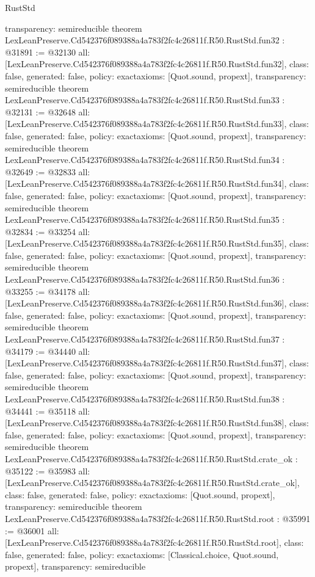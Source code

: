 \begin{lexlean}{RustStd}
\begin{coremodule}
{  transparency: semireducible
}
theorem LexLeanPreserve.Cd542376f089388a4a783f2fc4c26811f.R50.RustStd.fun32 : @31891 := @32130 {
  all: [LexLeanPreserve.Cd542376f089388a4a783f2fc4c26811f.R50.RustStd.fun32],
  class: false,
  generated: false,
  policy: exact{axioms: [Quot.sound, propext]},
  transparency: semireducible
}
theorem LexLeanPreserve.Cd542376f089388a4a783f2fc4c26811f.R50.RustStd.fun33 : @32131 := @32648 {
  all: [LexLeanPreserve.Cd542376f089388a4a783f2fc4c26811f.R50.RustStd.fun33],
  class: false,
  generated: false,
  policy: exact{axioms: [Quot.sound, propext]},
  transparency: semireducible
}
theorem LexLeanPreserve.Cd542376f089388a4a783f2fc4c26811f.R50.RustStd.fun34 : @32649 := @32833 {
  all: [LexLeanPreserve.Cd542376f089388a4a783f2fc4c26811f.R50.RustStd.fun34],
  class: false,
  generated: false,
  policy: exact{axioms: [Quot.sound, propext]},
  transparency: semireducible
}
theorem LexLeanPreserve.Cd542376f089388a4a783f2fc4c26811f.R50.RustStd.fun35 : @32834 := @33254 {
  all: [LexLeanPreserve.Cd542376f089388a4a783f2fc4c26811f.R50.RustStd.fun35],
  class: false,
  generated: false,
  policy: exact{axioms: [Quot.sound, propext]},
  transparency: semireducible
}
theorem LexLeanPreserve.Cd542376f089388a4a783f2fc4c26811f.R50.RustStd.fun36 : @33255 := @34178 {
  all: [LexLeanPreserve.Cd542376f089388a4a783f2fc4c26811f.R50.RustStd.fun36],
  class: false,
  generated: false,
  policy: exact{axioms: [Quot.sound, propext]},
  transparency: semireducible
}
theorem LexLeanPreserve.Cd542376f089388a4a783f2fc4c26811f.R50.RustStd.fun37 : @34179 := @34440 {
  all: [LexLeanPreserve.Cd542376f089388a4a783f2fc4c26811f.R50.RustStd.fun37],
  class: false,
  generated: false,
  policy: exact{axioms: [Quot.sound, propext]},
  transparency: semireducible
}
theorem LexLeanPreserve.Cd542376f089388a4a783f2fc4c26811f.R50.RustStd.fun38 : @34441 := @35118 {
  all: [LexLeanPreserve.Cd542376f089388a4a783f2fc4c26811f.R50.RustStd.fun38],
  class: false,
  generated: false,
  policy: exact{axioms: [Quot.sound, propext]},
  transparency: semireducible
}
theorem LexLeanPreserve.Cd542376f089388a4a783f2fc4c26811f.R50.RustStd.crate_ok : @35122 := @35983 {
  all: [LexLeanPreserve.Cd542376f089388a4a783f2fc4c26811f.R50.RustStd.crate_ok],
  class: false,
  generated: false,
  policy: exact{axioms: [Quot.sound, propext]},
  transparency: semireducible
}
theorem LexLeanPreserve.Cd542376f089388a4a783f2fc4c26811f.R50.RustStd.root : @35991 := @36001 {
  all: [LexLeanPreserve.Cd542376f089388a4a783f2fc4c26811f.R50.RustStd.root],
  class: false,
  generated: false,
  policy: exact{axioms: [Classical.choice, Quot.sound, propext]},
  transparency: semireducible
}


\end{coremodule}
\end{lexlean}
